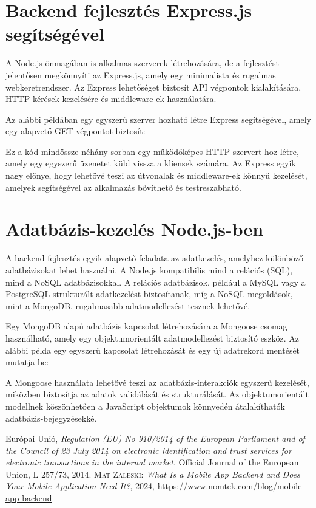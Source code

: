 \documentclass[
]{thesis-ekf}
\theoremstyle{definition}
\theoremstyle{remark}
\begin{document}
\section{Backend fejlesztés Express.js segítségével}

A Node.js önmagában is alkalmas szerverek létrehozására, de a fejlesztést jelentősen megkönnyíti az Express.js, amely egy minimalista és rugalmas webkeretrendszer. Az Express lehetőséget biztosít API végpontok kialakítására, HTTP kérések kezelésére és middleware-ek használatára.

Az alábbi példában egy egyszerű szerver hozható létre Express segítségével, amely egy alapvető GET végpontot biztosít:



Ez a kód mindössze néhány sorban egy működőképes HTTP szervert hoz létre, amely egy egyszerű üzenetet küld vissza a kliensek számára. Az Express egyik nagy előnye, hogy lehetővé teszi az útvonalak és middleware-ek könnyű kezelését, amelyek segítségével az alkalmazás bővíthető és testreszabható.

\section{Adatbázis-kezelés Node.js-ben}

A backend fejlesztés egyik alapvető feladata az adatkezelés, amelyhez különböző adatbázisokat lehet használni. A Node.js kompatibilis mind a relációs (SQL), mind a NoSQL adatbázisokkal. A relációs adatbázisok, például a MySQL vagy a PostgreSQL strukturált adatkezelést biztosítanak, míg a NoSQL megoldások, mint a MongoDB, rugalmasabb adatmodellezést tesznek lehetővé.

Egy MongoDB alapú adatbázis kapcsolat létrehozására a Mongoose csomag használható, amely egy objektumorientált adatmodellezést biztosító eszköz. Az alábbi példa egy egyszerű kapcsolat létrehozását és egy új adatrekord mentését mutatja be:



A Mongoose használata lehetővé teszi az adatbázis-interakciók egyszerű kezelését, miközben biztosítja az adatok validálását és strukturálását. Az objektumorientált modellnek köszönhetően a JavaScript objektumok könnyedén átalakíthatók adatbázis-bejegyzésekké.
	
\begin{thebibliography}{9}
	 Európai Unió, \textit{Regulation (EU) No 910/2014 of the European Parliament and of the Council of 23 July 2014 on electronic identification and trust services for electronic transactions in the internal market}, Official Journal of the European Union, L 257/73, 2014.
	 \textsc{Mat Zaleski:} \textit{What Is a Mobile App Backend and Does Your Mobile Application Need It?}, 2024, \url{https://www.nomtek.com/blog/mobile-app-backend}
\end{thebibliography}
	
\end{document}
